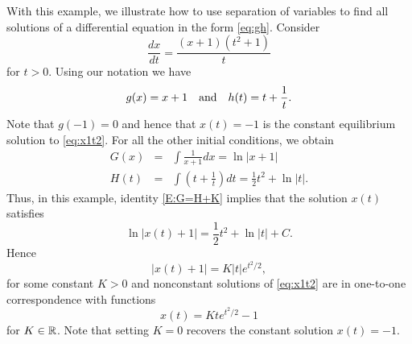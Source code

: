 \documentclass{ximera}
\begin{document}
With this example, we illustrate how to use separation of variables to find 
all solutions of a differential equation in the form \eqref{eq:gh}.  Consider
\begin{equation} \label{eq:x1t2}
\frac{dx}{dt} = \frac{(x+1)(t^2+1)}{t}
\end{equation}
for $t>0$.  Using our notation we have 
\[
g(x) = x+1 \quad\mbox{and}\quad h(t) = t+\frac{1}{t}.
\]
Note that $g(-1)=0$ and hence that $x(t)=-1$ is the constant equilibrium 
solution to \eqref{eq:x1t2}.  For all the other initial conditions, we obtain 
\[
\begin{array}{rcl}
G(x) & = & \int \frac{1}{x+1} dx = \ln|x+1| \\
H(t) & = & \int\left(t + \frac{1}{t}\right)dt = \frac{1}{2}t^2 + \ln |t|.
\end{array}
\]
Thus, in this example, identity \eqref{E:G=H+K} implies that the 
solution $x(t)$ satisfies
\[
\ln |x(t)+1| = \frac{1}{2}t^2 + \ln |t| + C.
\]
Hence
\[
|x(t)+1| = K|t|e^{t^2/2},
\]
for some constant $K>0$ and nonconstant solutions of \eqref{eq:x1t2} are in 
one-to-one correspondence with functions
\[
x(t) = Kte^{t^2/2}-1
\]
for $K\in\mbox{$\Bbb{R}$}$.  Note that setting $K=0$ recovers the constant solution 
$x(t)=-1$.

\EXER

\TEXER
\end{document}
